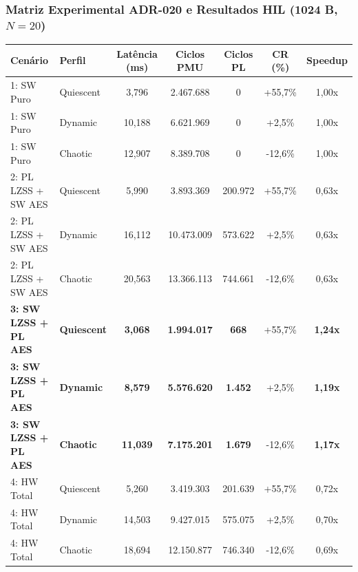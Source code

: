 \documentclass[../main.tex]{subfiles}
\begin{document}

\begin{frame}
  \frametitle{Matriz Experimental ADR-020 e Resultados HIL (1024 B, $N=20$)}
  \scriptsize
  \renewcommand{\arraystretch}{1.15}
  \begin{tabular}{@{}llccccc@{}}
    \toprule
    \textbf{Cen\'ario} & \textbf{Perfil} & \textbf{Lat\^encia (ms)} & \textbf{Ciclos PMU} & \textbf{Ciclos PL} & \textbf{CR (\%)} & \textbf{Speedup}\\
    \midrule
    1: SW Puro & Quiescent & 3,796 & 2.467.688 & 0 & +55,7\% & 1,00x\\
    1: SW Puro & Dynamic & 10,188 & 6.621.969 & 0 & +2,5\% & 1,00x\\
    1: SW Puro & Chaotic & 12,907 & 8.389.708 & 0 & -12,6\% & 1,00x\\
    \midrule
    2: PL LZSS + SW AES & Quiescent & 5,990 & 3.893.369 & 200.972 & +55,7\% & 0,63x\\
    2: PL LZSS + SW AES & Dynamic & 16,112 & 10.473.009 & 573.622 & +2,5\% & 0,63x\\
    2: PL LZSS + SW AES & Chaotic & 20,563 & 13.366.113 & 744.661 & -12,6\% & 0,63x\\
    \midrule
    \textbf{3: SW LZSS + PL AES} & \textbf{Quiescent} & \textbf{3,068} & \textbf{1.994.017} & \textbf{668} & +55,7\% & \textbf{1,24x}\\
    \textbf{3: SW LZSS + PL AES} & \textbf{Dynamic} & \textbf{8,579} & \textbf{5.576.620} & \textbf{1.452} & +2,5\% & \textbf{1,19x}\\
    \textbf{3: SW LZSS + PL AES} & \textbf{Chaotic} & \textbf{11,039} & \textbf{7.175.201} & \textbf{1.679} & -12,6\% & \textbf{1,17x}\\
    \midrule
    4: HW Total & Quiescent & 5,260 & 3.419.303 & 201.639 & +55,7\% & 0,72x\\
    4: HW Total & Dynamic & 14,503 & 9.427.015 & 575.075 & +2,5\% & 0,70x\\
    4: HW Total & Chaotic & 18,694 & 12.150.877 & 746.340 & -12,6\% & 0,69x\\
    \bottomrule
  \end{tabular}
\end{frame}
\end{document}
